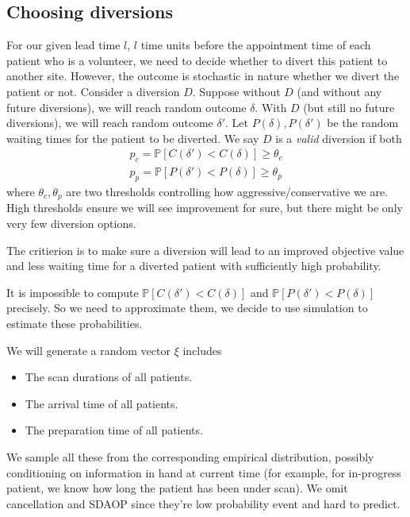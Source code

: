 \subsection{Choosing diversions}

For our given lead time $l$, $l$ time units before the appointment
time of each patient who is a volunteer, we need to
decide whether to divert this patient to another site. However, the
outcome is stochastic in
nature whether we divert the patient or not. Consider a diversion
$D$. Suppose without $D$ (and without any future diversions), we will
reach random outcome $\delta$. With $D$ (but still no future
diversions), we will reach random outcome $\delta'$. Let
$P(\delta), P(\delta')$ be the random waiting times for the patient 
to be diverted. We say $D$ is a \textit{valid} diversion if both
\begin{align*}
  p_c = \mathbb{P}[C(\delta') < C(\delta)] \ge \theta_c   \\
  p_p = \mathbb{P}[P(\delta') < P(\delta)] \ge \theta_p
\end{align*}
where $\theta_c, \theta_p$ are two thresholds controlling how
aggressive/conservative we are. High thresholds ensure we will
see improvement for sure, but there might be only very few
diversion options.

The critierion is to make sure a diversion will lead to an
improved objective value and less waiting time for a diverted
patient with sufficiently high probability.

It is impossible to compute $\mathbb{P}[C(\delta') < C(\delta)]$ and
$\mathbb{P}[P(\delta') < P(\delta)]$ precisely. So we need to approximate
them, we decide to use simulation to estimate these probabilities.

We will generate a random vector $\xi$ includes
\begin{itemize}
\item The scan durations of all patients.
\item The arrival time of all patients.
\item The preparation time of all patients.
\end{itemize}
We sample all these from the corresponding empirical distribution,
possibly conditioning on information in hand at current time
(for example, for in-progress patient, we know how long the patient
has been under scan). We omit cancellation and SDAOP since
they're low probability event and hard to predict.

